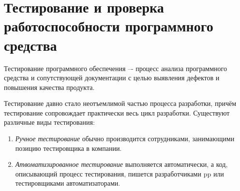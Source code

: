 \section{Тестирование и проверка работоспособности программного средства}
\label{sec:testing}

Тестирование программного обеспечения –- процесс анализа программного средства и сопутствующей документации с целью выявления дефектов и повышения качества продукта\cite{kulikov_testing}.

Тестирование давно стало неотъемлимой частью процесса разработки, причём тестирование сопровождает практически весь цикл разработки. Существуют различные виды тестирования:
\begin{enumerate}
	\item \textit{Ручное тестирование} обычно производится сотрудниками, занимающими позицию тестировщика в компании.
	\item \textit{Атвоматизированное тестирование} выполняется автоматически, а код, описывающий процесс тестирования, пишется разработчиками \gls{pp} или тестировщиками автоматизаторами.
\end{enumerate}